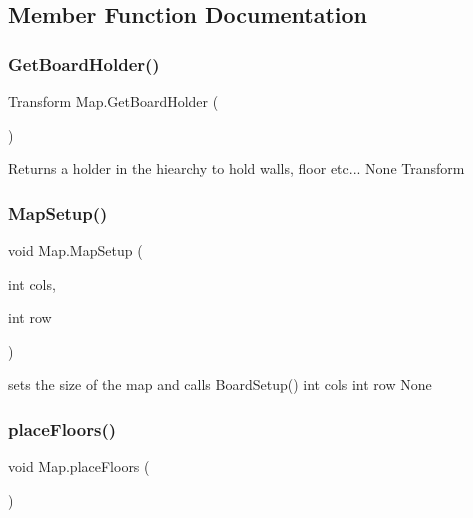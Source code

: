 \subsection{Member Function Documentation}
\mbox{\label{class_map_a65f298678747e49b6f99ba46271e2519}} 
\subsubsection{\texorpdfstring{Get\+Board\+Holder()}{GetBoardHolder()}}
{\footnotesize\ttfamily Transform Map.\+Get\+Board\+Holder (\begin{DoxyParamCaption}{ }\end{DoxyParamCaption})\hspace{0.3cm}{\ttfamily [inline]}}

Returns a holder in the hiearchy to hold walls, floor etc...  None  Transform \mbox{\label{class_map_a61d3bb5dbaec40d06efb1b29539f3d2f}} 
\subsubsection{\texorpdfstring{Map\+Setup()}{MapSetup()}}
{\footnotesize\ttfamily void Map.\+Map\+Setup (\begin{DoxyParamCaption}\item[{int}]{cols,  }\item[{int}]{row }\end{DoxyParamCaption})\hspace{0.3cm}{\ttfamily [inline]}}

sets the size of the map and calls Board\+Setup()  int cols  int row  None \mbox{\label{class_map_a4b4925269b22d09fc07109d19f8c32e6}} 
\subsubsection{\texorpdfstring{place\+Floors()}{placeFloors()}}
{\footnotesize\ttfamily void Map.\+place\+Floors (\begin{DoxyParamCaption}{ }\end{DoxyParamCaption})\hspace{0.3cm}{\ttfamily [inline]}}


